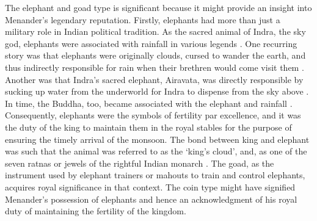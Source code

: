 \documentclass{ijsra}
\begin{document}
The elephant and goad type is significant because it might provide an insight into Menander’s legendary reputation.
Firstly, elephants had more than just a military role in Indian political tradition.
As the sacred animal of Indra, the sky god, elephants were associated with rainfall in various legends \parencites[19]{Gupta1983}[37--43]{Srivastava1989}.%
One recurring story was that elephants were originally clouds, cursed to wander the earth, 
and thus indirectly responsible for rain when their brethren would come visit them \parencite[38--39]{Gonda1966}. 
Another was that Indra’s sacred elephant, Airavata, was directly responsible by sucking up water from the underworld for
Indra to dispense from the sky above \parencite[23--24]{Gupta1983}. 
In time, the Buddha, too, became associated with the elephant and rainfall \parencite[23--24]{Gupta1983}. 
Consequently, elephants were the symbols of fertility par excellence, and it was the duty of the king to maintain them in
the royal stables for the purpose of ensuring the timely arrival of the monsoon. 
The bond between king and elephant was such that the animal was referred to as the ‘king’s cloud’, and,
as one of the seven ratnas or jewels of the rightful Indian monarch \parencites[38--39]{Gonda1966}[107]{Zimmer2015}.
The goad, as the instrument used by elephant trainers or mahouts to train and control elephants,
acquires royal significance in that context.
The coin type might have signified Menander’s possession of elephants and hence an acknowledgment of his royal duty of maintaining
the fertility of the kingdom.
\end{document}
